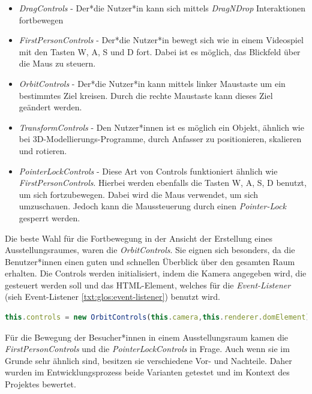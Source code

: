 \begin{itemize}
    \item \emph{DragControls} - Der*die Nutzer*in kann sich mittels \emph{DragNDrop} Interaktionen fortbewegen \cite{DragControls}
    \item \emph{FirstPersonControls} - Der*die Nutzer*in bewegt sich wie in einem Videospiel mit den Tasten W, A, S und D fort. Dabei ist es möglich, das Blickfeld über die Maus zu steuern. \cite{FirstPersonControls}
    \item \emph{OrbitControls} - Der*die Nutzer*in kann mittels linker Maustaste um ein bestimmtes Ziel kreisen. Durch die rechte Maustaste kann dieses Ziel geändert werden. \cite{OrbitControls}
    \item \emph{TransformControls} - Den Nutzer*innen ist es möglich ein Objekt, ähnlich wie bei 3D-Modellierungs-Programme, durch Anfasser zu positionieren, skalieren und rotieren. \cite{TransformControls}
    \item \emph{PointerLockControls} - Diese Art von Controls funktioniert ähnlich wie \emph{FirstPersonControls}. Hierbei werden ebenfalls die Tasten W, A, S, D benutzt, um sich fortzubewegen. Dabei wird die Maus verwendet, um sich umzuschauen. Jedoch kann die Maussteuerung durch einen \emph{Pointer-Lock} gesperrt werden.\cite{PointerLockControls}
\end{itemize}


Die beste Wahl für die Fortbewegung in der Ansicht der Erstellung eines Ausstellungsraumes, waren die \emph{OrbitControls}. Sie eignen sich besonders, da die Benutzer*innen einen guten und schnellen Überblick über den gesamten Raum erhalten.
Die Controls werden initialisiert, indem die Kamera angegeben wird, die gesteuert werden soll und das HTML-Element, welches für die \emph{Event-Listener} (sieh Event-Listener \ref{txt:glos:event-listener}) benutzt wird.

\begin{lstlisting}[caption={OrbitControls initialisieren},language=TypeScript]
    this.controls = new OrbitControls(this.camera,this.renderer.domElement)
    \end{lstlisting}

Für die Bewegung der Besucher*innen in einem Ausstellungsraum kamen die \emph{FirstPersonControls} und die \emph{PointerLockControls} in Frage. Auch wenn sie im Grunde sehr ähnlich sind, besitzen sie verschiedene Vor- und Nachteile. Daher wurden im Entwicklungsprozess beide Varianten getestet und im Kontext des Projektes bewertet.

